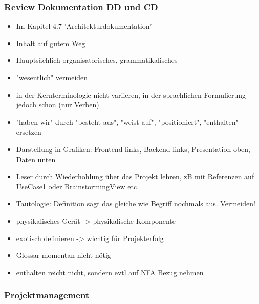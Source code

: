 \hypertarget{review-dokumentation-dd-und-cd}{%
\subsubsection*{Review Dokumentation DD und
CD}\label{review-dokumentation-dd-und-cd}}

\begin{itemize}
\item
  Im Kapitel 4.7 'Architekturdokumentation'
\item
  Inhalt auf gutem Weg
\item
  Hauptsächlich organisatorisches, grammatikalisches
\item
  "wesentlich" vermeiden
\item
  in der Kernterminologie nicht variieren, in der sprachlichen
  Formulierung jedoch schon (nur Verben)
\item
  "haben wir" durch "besteht aus", "weist auf", "positioniert",
  "enthalten" ersetzen
\item
  Darstellung in Grafiken: Frontend links, Backend links, Presentation
  oben, Daten unten
\item
  Leser durch Wiederhohlung über das Projekt lehren, zB mit Referenzen
  auf UseCase1 oder BrainstormingView etc.
\item
  Tautologie: Definition sagt das gleiche wie Begriff nochmals aus.
  Vermeiden!
\item
  physikalisches Gerät -\textgreater{} physikalische Komponente
\item
  exotisch definieren -\textgreater{} wichtig für Projekterfolg
\item
  Glossar momentan nicht nötig
\item
  enthalten reicht nicht, sondern evtl auf NFA Bezug nehmen
\end{itemize}

\hypertarget{projektmanagement}{%
\subsubsection*{Projektmanagement}\label{projektmanagement}}

